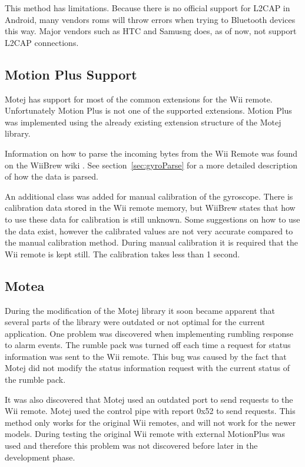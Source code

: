 This method has limitations. Because there is no official support for L2CAP in Android, many vendors roms will throw errors when trying to Bluetooth devices this way. Major vendors such as HTC and Samusng does, as of now, not support L2CAP connections.

\subsection{Motion Plus Support}
Motej has support for most of the common extensions for the Wii remote. Unfortunately Motion Plus is not one of the supported extensions. Motion Plus was implemented using the already existing extension structure of the Motej library.

Information on how to parse the incoming bytes from the Wii Remote was found on the WiiBrew wiki \cite{wiiBrew}. See section~\ref{sec:gyroParse} for a more detailed description of how the data is parsed. 

An additional class was added for manual calibration of the gyroscope. There is calibration data stored in the Wii remote memory, but WiiBrew states that how to use these data for calibration is still unknown. Some suggestions on how to use the data exist, however the calibrated values are not very accurate compared to the manual calibration method. During manual calibration it is required that the Wii remote is kept still. The calibration takes less than 1 second.

\subsection{Motea}
\label{sec:motea}
During the modification of the Motej library it soon became apparent that several parts of the library were outdated or not optimal for the current application. One problem was discovered when implementing rumbling response to alarm events. The rumble pack was turned off each time a request for status information was sent to the Wii remote. This bug was caused by the fact that Motej did not modify the status information request with the current status of the rumble pack.

It was also discovered that Motej used an outdated port to send requests to the Wii remote. Motej used the control pipe with report 0x52 to send requests. This method only works for the original Wii remotes, and will not work for the newer models. During testing the original Wii remote with external MotionPlus was used and therefore this problem was not discovered before later in the development phase.

